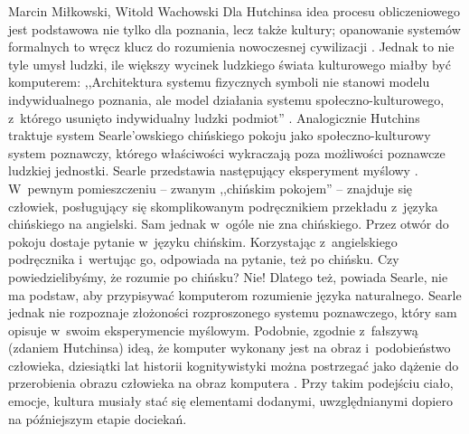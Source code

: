 \begin{artplenv2auth}{Marcin Miłkowski, Witold Wachowski}
Dla Hutchinsa idea procesu obliczeniowego jest podstawowa nie tylko dla poznania, lecz także kultury; opanowanie systemów formalnych to wręcz klucz do rozumienia nowoczesnej cywilizacji
\parencite[][s.~359–360]{hutchins_cognition_1995}. %
 Jednak to nie tyle umysł ludzki, ile większy wycinek ludzkiego świata kulturowego miałby być komputerem: ,,Architektura systemu fizycznych symboli nie stanowi modelu indywidualnego poznania, ale model działania systemu społeczno-kulturowego, z~którego usunięto indywidualny ludzki podmiot'' 
\parencite[][s.~363]{hutchins_cognition_1995}. %
 Analogicznie Hutchins traktuje system Searle'owskiego chińskiego pokoju jako społeczno-kulturowy system poznawczy, którego właściwości wykraczają poza możliwości poznawcze ludzkiej jednostki. Searle przedstawia następujący eksperyment myślowy 
\parencite[][]{searle_umysly_1995}. %
 W~pewnym pomieszczeniu -- zwanym ,,chińskim pokojem'' -- znajduje się człowiek, posługujący się skomplikowanym podręcznikiem przekładu z~języka chińskiego na angielski. Sam jednak w~ogóle nie zna chińskiego. Przez otwór do pokoju dostaje pytanie w~języku chińskim. Korzystając z~angielskiego podręcznika i~wertując go, odpowiada na pytanie, też po chińsku. Czy powiedzielibyśmy, że rozumie po chińsku? Nie! Dlatego też, powiada Searle, nie ma podstaw, aby przypisywać komputerom rozumienie języka naturalnego. Searle jednak nie rozpoznaje złożoności rozproszonego systemu poznawczego, który sam opisuje w~swoim eksperymencie myślowym. Podobnie, zgodnie z~fałszywą (zdaniem Hutchinsa) ideą, że komputer wykonany jest na obraz i~podobieństwo człowieka, dziesiątki lat historii kognitywistyki można postrzegać jako dążenie do przerobienia obrazu człowieka na obraz komputera 
\parencite[][s.~361–363]{hutchins_cognition_1995}. %
 Przy takim podejściu ciało, emocje, kultura musiały stać się elementami dodanymi, uwzględnianymi dopiero na późniejszym etapie dociekań.


\end{artplenv2auth}
